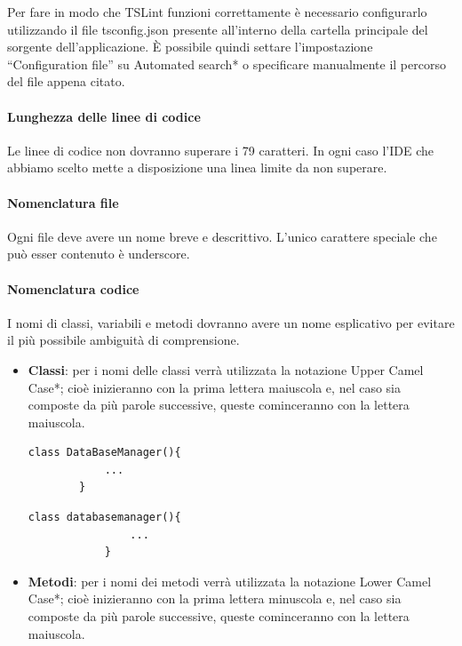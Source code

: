 \documentclass[11pt,a4paper]{article}
\begin{document}
{	Per fare in modo che TSLint funzioni correttamente è necessario configurarlo utilizzando il file tsconfig.json presente all'interno della cartella principale del sorgente dell'applicazione. È possibile quindi settare l'impostazione ``Configuration file'' su Automated search* o specificare manualmente il percorso del file appena citato.
	
	\paragraph{Lunghezza delle linee di codice} Le linee di codice non dovranno superare i 79 caratteri. In ogni caso l'IDE che abbiamo scelto mette a disposizione una linea limite da non superare.
	\paragraph{Nomenclatura file} 
	Ogni file deve avere un nome breve e descrittivo. L'unico carattere speciale che può esser contenuto è underscore.
	\paragraph{Nomenclatura codice}
	I nomi di classi, variabili e metodi dovranno avere un nome esplicativo per evitare il più possibile ambiguità di comprensione.
	\begin{itemize}
		\item \textbf{Classi}: per i nomi delle classi verrà utilizzata la notazione Upper Camel Case*; cioè inizieranno con la prima lettera maiuscola e, nel caso sia composte da più parole successive, queste cominceranno con la lettera maiuscola.
	
		\begin{multicols}{2}
			
			\begin{lstlisting}[caption=nome classe corretto]
		class DataBaseManager(){
			...
		}
			\end{lstlisting}
			
			\begin{lstlisting}[caption=nome classe scorretto]
			class databasemanager(){
				...
			}
			\end{lstlisting}
		\end{multicols}
		
		
		\item \textbf{Metodi}: per i nomi dei metodi verrà utilizzata la notazione Lower Camel Case*; cioè inizieranno con la prima lettera minuscola e, nel caso sia composte da più parole successive, queste cominceranno con la lettera maiuscola.
	


\end{itemize}}
\end{document}
